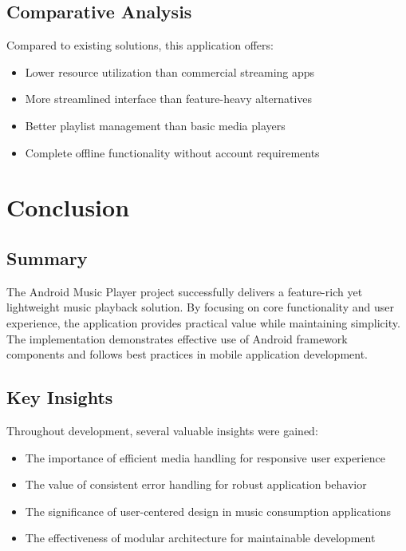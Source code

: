 \documentclass{article}
\begin{document}
\subsection{Comparative Analysis}
Compared to existing solutions, this application offers:
\begin{itemize}
    \item Lower resource utilization than commercial streaming apps
    \item More streamlined interface than feature-heavy alternatives
    \item Better playlist management than basic media players
    \item Complete offline functionality without account requirements
\end{itemize}

\section{Conclusion}
\subsection{Summary}
The Android Music Player project successfully delivers a feature-rich yet lightweight music playback solution. By focusing on core functionality and user experience, the application provides practical value while maintaining simplicity. The implementation demonstrates effective use of Android framework components and follows best practices in mobile application development.

\subsection{Key Insights}
Throughout development, several valuable insights were gained:
\begin{itemize}
    \item The importance of efficient media handling for responsive user experience
    \item The value of consistent error handling for robust application behavior
    \item The significance of user-centered design in music consumption applications
    \item The effectiveness of modular architecture for maintainable development
\end{itemize}
\end{document}
